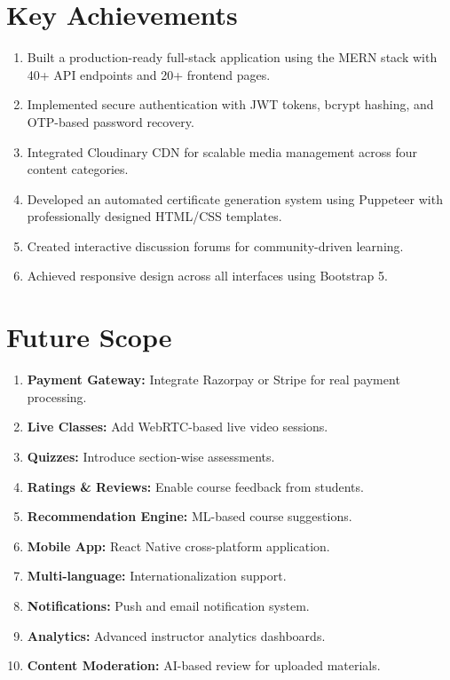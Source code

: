 \documentclass[12pt,a4paper]{report}
\begin{document}
\section{Key Achievements}
\begin{enumerate}
    \item Built a production-ready full-stack application using the MERN stack with 40+ API endpoints and 20+ frontend pages.
    \item Implemented secure authentication with JWT tokens, bcrypt hashing, and OTP-based password recovery.
    \item Integrated Cloudinary CDN for scalable media management across four content categories.
    \item Developed an automated certificate generation system using Puppeteer with professionally designed HTML/CSS templates.
    \item Created interactive discussion forums for community-driven learning.
    \item Achieved responsive design across all interfaces using Bootstrap 5.
\end{enumerate}

\section{Future Scope}
\begin{enumerate}
    \item \textbf{Payment Gateway:} Integrate Razorpay or Stripe for real payment processing.
    \item \textbf{Live Classes:} Add WebRTC-based live video sessions.
    \item \textbf{Quizzes:} Introduce section-wise assessments.
    \item \textbf{Ratings \& Reviews:} Enable course feedback from students.
    \item \textbf{Recommendation Engine:} ML-based course suggestions.
    \item \textbf{Mobile App:} React Native cross-platform application.
    \item \textbf{Multi-language:} Internationalization support.
    \item \textbf{Notifications:} Push and email notification system.
    \item \textbf{Analytics:} Advanced instructor analytics dashboards.
    \item \textbf{Content Moderation:} AI-based review for uploaded materials.
\end{enumerate}
\end{document}
